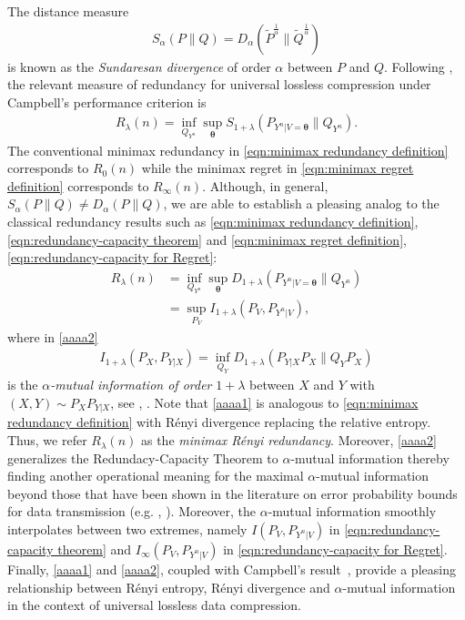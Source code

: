 \documentclass[journal, 10pt]{IEEEtran}
\theoremstyle{plain}
\theoremstyle{plain}
\theoremstyle{plain}
\theoremstyle{plain}
\newcommand{\boldtheta}{\mathbold{\theta}}
\begin{document}
The distance measure
\begin{align}
	S_\alpha(P \| Q)=D_\alpha (\widetilde{P}^{ \frac{1}{\alpha}}\|\widetilde{Q}^{\frac{1}{\alpha}})
\end{align}
is known as the \emph{Sundaresan divergence} of order $\alpha$ between $P$ and $Q$. Following \cite{Sundaresan2007}, the relevant measure of redundancy for universal lossless compression under Campbell's performance criterion is 
\begin{align}
	R_\lambda(n)=\inf_{Q_{Y^n}} \sup_{\boldtheta} 	S_{1+\lambda}(P_{Y^n|V=\boldtheta} \| Q_{Y^n} )\text{.} \label{eqn:minimax renyi redundancy}
\end{align}
The conventional minimax redundancy in \eqref{eqn:minimax redundancy definition} corresponds to $R_0(n)$ while the minimax regret in \eqref{eqn:minimax regret definition} corresponds to $R_\infty(n)$. Although, in general, $ S_{\alpha} ( P \| Q) \neq D_{\alpha} ( P \|Q) $, we are able to establish a pleasing analog to the classical redundancy results such as \eqref{eqn:minimax redundancy definition}, \eqref{eqn:redundancy-capacity theorem} and \eqref{eqn:minimax regret definition}, \eqref{eqn:redundancy-capacity for Regret}:
\begin{align}
R_\lambda(n)&=\inf_{Q_{Y^n}} \sup_{\boldtheta  } 	D_{1+\lambda}(P_{Y^n|V=\boldtheta}  \| Q_{Y^n} ) \label{aaaa1} \\
&=\sup_{P_V} I_{1+\lambda} (P_V, P_{Y^n|V} )\text{,} \label{aaaa2} 
\end{align}	
where in \eqref{aaaa2}
\begin{align}
I_{1+\lambda}(P_X, P_{Y|X}) = \inf_{Q_Y} D_{1+\lambda} (P_{Y|X}P_X \| Q_Y P_X)
\end{align}
is the \emph{$\alpha$-mutual information of order} $1+\lambda$ between $X$ and $Y$ with $(X,Y)\sim P_XP_{Y|X}$, see \cite{sibson1969information}, \cite{Verdu2015}. Note that \eqref{aaaa1} is analogous to \eqref{eqn:minimax redundancy definition} with R\'enyi divergence replacing the relative entropy. Thus, we refer $R_\lambda(n)$ as the \emph{minimax R\'enyi redundancy}. Moreover, \eqref{aaaa2} generalizes the Redundacy-Capacity Theorem to $\alpha$-mutual information thereby finding another operational meaning for the maximal $\alpha$-mutual information beyond those that have been shown in the literature on error probability bounds for data transmission (e.g. \cite{Verdu2015}, \cite{Csiszar95}). Moreover, the $\alpha$-mutual information smoothly interpolates between two extremes, namely $I(P_V, P_{Y^n|V})$ in \eqref{eqn:redundancy-capacity theorem} and $I_\infty(P_V, P_{Y^n|V})$ in \eqref{eqn:redundancy-capacity for Regret}. Finally, \eqref{aaaa1} and \eqref{aaaa2}, coupled with Campbell's result~\cite{Campbell1965}, provide a pleasing relationship between R\'enyi entropy, R\'enyi	divergence and $\alpha$-mutual information in the context of universal lossless data compression.
\end{document}
